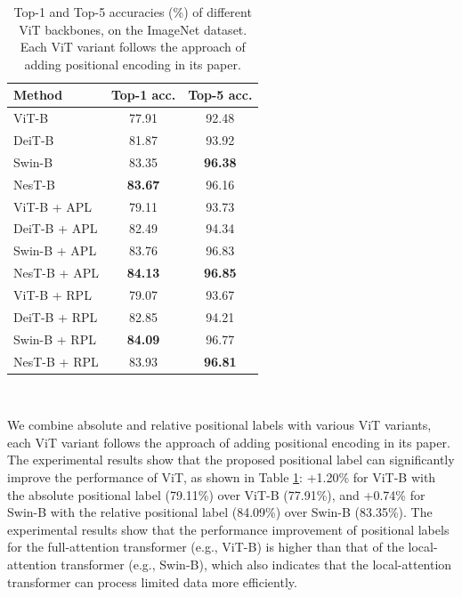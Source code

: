 \documentclass{article}
\begin{document}
\begin{table}[h]
   \centering
   \caption{Top-1 and Top-5 accuracies (\%) of different ViT backbones, on the ImageNet dataset. Each ViT variant follows the approach of adding positional encoding in its paper.}
   \begin{tabular}{l|c|c}
      \hline %
      Method                   & Top-1 acc.      & Top-5 acc.      \\
      \hline %
      ViT-B \cite{DBLP:journals/corr/abs-2010-11929}      & 77.91     &92.48     \\
      DeiT-B \cite{pmlr-v139-touvron21a}    & 81.87     &93.92     \\
      Swin-B \cite{Liu_2021_ICCV}    & 83.35     &\textbf{96.38}     \\
      NesT-B \cite{zhang2022nested}   & \textbf{83.67}     &96.16     \\
      \hline %
      ViT-B + APL      & 79.11     &93.73     \\
      DeiT-B + APL    & 82.49     &94.34     \\
      Swin-B + APL    & 83.76     &96.83     \\
      NesT-B + APL    & \textbf{84.13}     &\textbf{96.85}     \\
      \hline %
      ViT-B + RPL      & 79.07     &93.67     \\
      DeiT-B + RPL    & 82.85     &94.21     \\
      Swin-B + RPL    & \textbf{84.09}     &96.77     \\
      NesT-B + RPL    & 83.93     &\textbf{96.81}     \\
      \hline %
   \end{tabular} \\
   \label{ImageNet-Top1AndTop5}
\end{table}

We combine absolute and relative positional labels with various ViT variants, each ViT variant follows the approach of adding positional encoding in its paper. The experimental results show that the proposed positional label can significantly improve the performance of ViT, as shown in Table \ref{ImageNet-Top1AndTop5}: +1.20\% for ViT-B with the absolute positional label (79.11\%) over ViT-B (77.91\%), and +0.74\% for Swin-B with the relative positional label (84.09\%) over Swin-B (83.35\%). The experimental results show that the performance improvement of positional labels for the full-attention transformer (e.g., ViT-B) is higher than that of the local-attention transformer (e.g., Swin-B), which also indicates that the local-attention transformer can process limited data more efficiently. 
\end{document}
